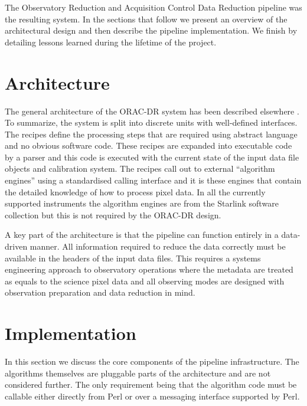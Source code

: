 \documentclass[final,authoryear,5p,times,twocolumn]{elsarticle}
\begin{document}
The Observatory Reduction and Acquisition Control Data Reduction pipeline
\citep[ORAC-DR;][]{1999ASPC..172...11E,2008AN....329..295C} was
the resulting system. In the sections that follow we present an
overview of the architectural design and then describe the pipeline
implementation. We finish by detailing lessons learned during the
lifetime of the project.

\section{Architecture}

The general architecture of the ORAC-DR system has been described
elsewhere \citep{1999ASPC..172...11E,2008AN....329..295C}. To
summarize, the system is split into discrete units with well-defined
interfaces. The recipes define the processing steps that are required
using abstract language and no obvious software code. These recipes
are expanded into executable code by a parser and this code is
executed with the current state of the input data file objects and
calibration system. The recipes call out to external ``algorithm
engines'' using a standardised calling interface and it is these
engines that contain the detailed knowledge of how to process pixel
data.  In all the currently supported instruments the algorithm
engines are from the Starlink software collection
\citep[][]{2014ASPC..485..391C} but this is not
required by the ORAC-DR design.

A key part of the architecture is that the pipeline can function
entirely in a data-driven manner. All information required to reduce
the data correctly must be available in the headers of the input data
files. This requires a systems engineering approach to observatory
operations where the metadata are treated as equals to the science
pixel data \citep[see e.g.,][for an overview of the JCMT and UKIRT
approach]{2011tfa..confE..42J} and all observing modes are designed
with observation preparation and data reduction in mind.

\section{Implementation}

In this section we discuss the core components of the pipeline
infrastructure. The algorithms themselves are pluggable parts of the
architecture and are not considered further. The only requirement
being that the algorithm code must be callable either directly from
Perl or over a messaging interface supported by Perl.
\end{document}
